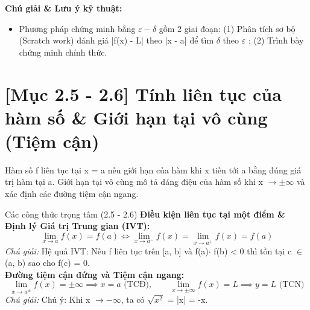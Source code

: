 \documentclass[11pt,a4paper,oneside]{book}
\begin{document}
\noindent\textbf{Chú giải \& Lưu ý kỹ thuật:}
\begin{itemize}[leftmargin=1.5em, itemsep=2pt]
  \item Phương pháp chứng minh bằng $\varepsilon - \delta$  gồm 2 giai đoạn: (1) Phân tích sơ bộ (Scratch work) đánh giá |f(x) - L| theo |x - a| để tìm $\delta$  theo $\varepsilon$ ; (2) Trình bày chứng minh chính thức.
\end{itemize}


\section{[Mục 2.5 - 2.6] Tính liên tục của hàm số \& Giới hạn tại vô cùng (Tiệm cận)}
Hàm số f liên tục tại x = a nếu giới hạn của hàm khi x tiến tới a bằng đúng giá trị hàm tại a. Giới hạn tại vô cùng mô tả dáng điệu của hàm số khi x $\to \pm \infty$ và xác định các đường tiệm cận ngang.

\begin{congthuc}{Các công thức trọng tâm (2.5 - 2.6)}
\noindent\textbf{Điều kiện liên tục tại một điểm \& Định lý Giá trị Trung gian (IVT):}
\[ \lim_{x \to a} f(x) = f(a) \iff \lim_{x \to a^-} f(x) = \lim_{x \to a^+} f(x) = f(a) \]
\noindent\textit{Chú giải:} Hệ quả IVT: Nếu f liên tục trên [a, b] và f(a)$\cdot$ f(b) < 0 thì tồn tại c $\in$  (a, b) sao cho f(c) = 0.\\[4pt]
\noindent\textbf{Đường tiệm cận đứng và Tiệm cận ngang:}
\[ \lim_{x \to a^\pm} f(x) = \pm\infty \implies x = a \text{ (TCĐ)}, \qquad \lim_{x \to \pm\infty} f(x) = L \implies y = L \text{ (TCN)} \]
\noindent\textit{Chú giải:} Chú ý: Khi x $\to - \infty$, ta có $$ = |x| = -x.\\[4pt]
\end{congthuc}
\end{document}
